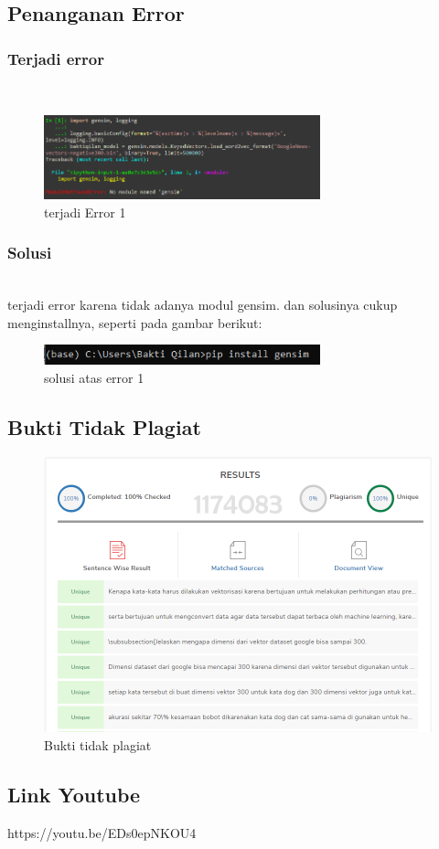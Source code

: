 \subsection{Penanganan Error}
\subsubsection{Terjadi error}
\hfill\\
\begin{figure}[H]
	\centering
	\includegraphics[width=8cm]{figures/1174083/figures5/error1.png}
	\caption{terjadi Error 1}
\end{figure}

\subsubsection{Solusi}
\hfill\\
terjadi error karena tidak adanya modul gensim. dan solusinya cukup menginstallnya, seperti pada gambar berikut:
\begin{figure}[H]
	\centering
	\includegraphics[width=8cm]{figures/1174083/figures5/s1.png}
	\caption{solusi atas error 1}
\end{figure}

\subsection{Bukti Tidak Plagiat}
\begin{figure}[H]
	\includegraphics[width=12cm]{figures/1174083/figures5/plagiarism.png}
	\centering
	\caption{Bukti tidak plagiat}
\end{figure}

\subsection{Link Youtube}
https://youtu.be/EDs0epNKOU4